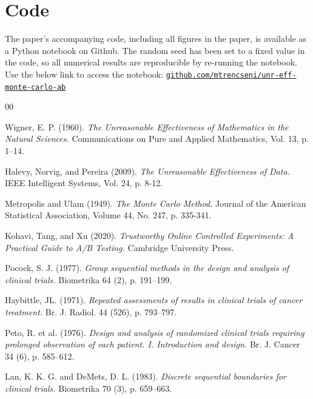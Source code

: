 \documentclass[final,5p,times,twocolumn,authoryear]{elsarticle}
\begin{document}
\section{Code}

The paper's accompanying code, including all figures in the paper, is available as a Python notebook on Github. The random seed has been set to a fixed value in the code, so all numerical results are reproducible by re-running the notebook. Use the below link to access the notebook:
\href{https://github.com/mtrencseni/unr-eff-monte-carlo-ab}{\texttt{{\ssmall github.com/mtrencseni/unr-eff-monte-carlo-ab}}}

 

\footnotesize
\begin{thebibliography}{00}

 Wigner, E. P. (1960). \textit{The Unreasonable Effectiveness of Mathematics in the Natural Sciences.} Communications on Pure and Applied Mathematics, Vol. 13, p. 1–14.

 Halevy, Norvig, and Pereira (2009). \textit{The Unreasonable Effectiveness of Data.} IEEE Intelligent Systems, Vol. 24, p. 8-12.

 Metropolis and Ulam (1949). \textit{The Monte Carlo Method.} Journal of the American Statistical Association, Volume 44, No. 247, p. 335-341.

 Kohavi, Tang, and Xu (2020). \textit{Trustworthy Online Controlled Experiments: A Practical Guide to A/B Testing.} Cambridge University Press.

 Pocock, S. J. (1977). \textit{Group sequential methods in the design and analysis of clinical trials.} Biometrika 64 (2), p. 191–199.

 Haybittle, JL. (1971). \textit{Repeated assessments of results in clinical trials of cancer treatment.} Br. J. Radiol. 44 (526), p. 793–797.

 Peto, R. et al. (1976). \textit{Design and analysis of randomized clinical trials requiring prolonged observation of each patient. I. Introduction and design.} Br. J. Cancer 34 (6), p. 585–612.

 Lan, K. K. G. and DeMets, D. L. (1983). \textit{Discrete sequential boundaries for clinical trials.} Biometrika 70 (3), p. 659–663.


\end{thebibliography}
\end{document}
